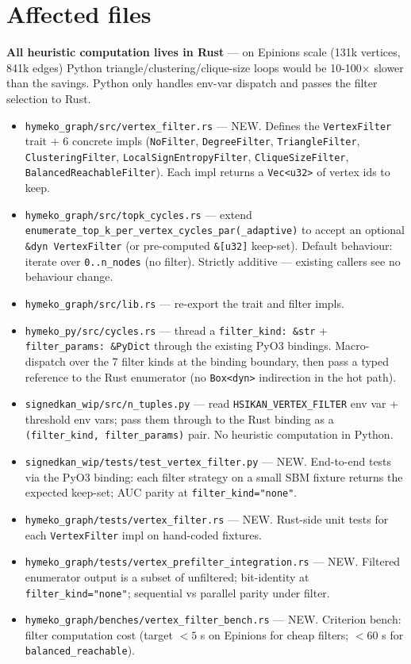 \documentclass[11pt,a4paper]{article}
\begin{document}
\section{Affected files}
\textbf{All heuristic computation lives in Rust} --- on Epinions scale
(131k vertices, 841k edges) Python triangle/clustering/clique-size
loops would be 10-100$\times$ slower than the savings.  Python only
handles env-var dispatch and passes the filter selection to Rust.
\begin{itemize}
\item \texttt{hymeko\_graph/src/vertex\_filter.rs} --- NEW.  Defines the
  \texttt{VertexFilter} trait + 6 concrete impls
  (\texttt{NoFilter}, \texttt{DegreeFilter}, \texttt{TriangleFilter},
  \texttt{ClusteringFilter}, \texttt{LocalSignEntropyFilter},
  \texttt{CliqueSizeFilter}, \texttt{BalancedReachableFilter}).  Each
  impl returns a \texttt{Vec<u32>} of vertex ids to keep.
\item \texttt{hymeko\_graph/src/topk\_cycles.rs} --- extend
  \texttt{enumerate\_top\_k\_per\_vertex\_cycles\_par(\_adaptive)} to
  accept an optional \texttt{\&dyn VertexFilter} (or pre-computed
  \texttt{\&[u32]} keep-set).  Default behaviour: iterate over
  \texttt{0..n\_nodes} (no filter).  Strictly additive --- existing
  callers see no behaviour change.
\item \texttt{hymeko\_graph/src/lib.rs} --- re-export the trait and
  filter impls.
\item \texttt{hymeko\_py/src/cycles.rs} --- thread a
  \texttt{filter\_kind: \&str} + \texttt{filter\_params: \&PyDict} through
  the existing PyO3 bindings.  Macro-dispatch over the 7 filter kinds at
  the binding boundary, then pass a typed reference to the Rust
  enumerator (no \texttt{Box<dyn>} indirection in the hot path).
\item \texttt{signedkan\_wip/src/n\_tuples.py} --- read
  \texttt{HSIKAN\_VERTEX\_FILTER} env var + threshold env vars; pass
  them through to the Rust binding as a \texttt{(filter\_kind,
  filter\_params)} pair.  No heuristic computation in Python.
\item \texttt{signedkan\_wip/tests/test\_vertex\_filter.py} --- NEW.
  End-to-end tests via the PyO3 binding: each filter strategy on a
  small SBM fixture returns the expected keep-set; AUC parity at
  \texttt{filter\_kind="none"}.
\item \texttt{hymeko\_graph/tests/vertex\_filter.rs} --- NEW.  Rust-side
  unit tests for each \texttt{VertexFilter} impl on hand-coded fixtures.
\item \texttt{hymeko\_graph/tests/vertex\_prefilter\_integration.rs} ---
  NEW.  Filtered enumerator output is a subset of unfiltered;
  bit-identity at \texttt{filter\_kind="none"}; sequential vs parallel
  parity under filter.
\item \texttt{hymeko\_graph/benches/vertex\_filter\_bench.rs} --- NEW.
  Criterion bench: filter computation cost (target $<5$ s on Epinions
  for cheap filters; $<60$ s for \texttt{balanced\_reachable}).
\end{itemize}
\end{document}
